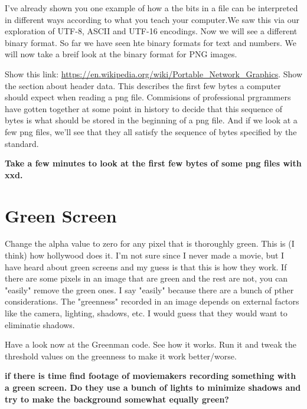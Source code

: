 \documentclass[12pt]{article}
\begin{document}
I've already shown you one example of how a the bits in a file can be interpreted in different ways according to what you teach your computer.We saw this via our exploration of UTF-8, ASCII and UTF-16 encodings. Now we will see a different binary format. So far we have seen hte binary formats for text and numbers. We will now take a breif look at the binary format for PNG images.

Show this link: \url{https://en.wikipedia.org/wiki/Portable_Network_Graphics}. Show the section about header data. This describes the first few bytes a computer should expect when reading a png file. Commisions of professional prgrammers have gotten together at some point in history to decide that this sequence of bytes is what should be stored in the beginning of a png file. And if we look at a few png files, we'll see that they all satisfy the sequence of bytes specified by the standard. 

\begin{center}
\textbf{Take a few minutes to look at the first few bytes of some png files with xxd.}
\end{center}

\section{Green Screen}
Change the alpha value to zero for any pixel that is thoroughly green. This is (I think) how hollywood does it. I'm not sure since I never made a movie, but I have heard about green screens and my guess is that this is how they work. If there are some pixels in an image that are green and the rest are not, you can "easily" remove the green ones. I say "easily" because there are a bunch of pther considerations. The "greenness" recorded in an image depends on external factors like the camera, lighting, shadows, etc. I would guess that they would want to eliminatie shadows.

Have a look now at the Greenman code. See how it works. Run it and tweak the threshold values on the greenness to make it work better/worse.



\begin{center}
\textbf{if there is time find footage of moviemakers recording something with a green screen. Do they use a bunch of lights to minimize shadows and try to make the background somewhat equally green?}
\end{center}
\end{document}
